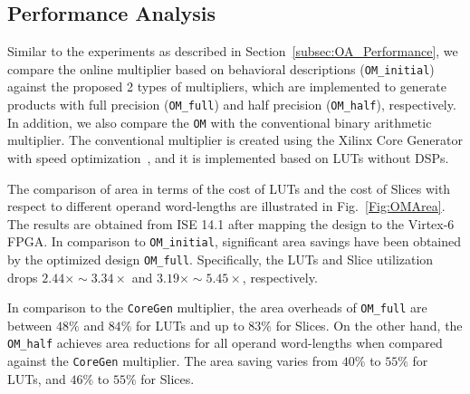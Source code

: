 \documentclass[conference]{IEEEtran}
\begin{document}
\subsection{Performance Analysis}
Similar to the experiments as described in Section~\ref{subsec:OA_Performance}, we compare the online multiplier based on behavioral descriptions (\texttt{OM\_initial}) against the proposed 2 types of multipliers, which are implemented to generate products with full precision (\texttt{OM\_full}) and half precision (\texttt{OM\_half}), respectively. In addition, we also compare the \texttt{OM} with the conventional binary arithmetic multiplier. The conventional multiplier is created using the Xilinx Core Generator with speed optimization~\cite{XilinxMult}, and it is implemented based on LUTs without DSPs.

The comparison of area in terms of the cost of LUTs and the cost of Slices with respect to different operand word-lengths are illustrated in Fig.~\ref{Fig:OMArea}. The results are obtained from ISE 14.1 after mapping the design to the Virtex-6 FPGA. In comparison to \texttt{OM\_initial}, significant area savings have been obtained by the optimized design \texttt{OM\_full}. Specifically, the LUTs and Slice utilization drops $2.44\times\sim3.34\times$ and $3.19\times\sim5.45\times$, respectively.

In comparison to the \texttt{CoreGen} multiplier, the area overheads of \texttt{OM\_full} are between $48\%$ and $84\%$ for LUTs and up to $83\%$ for Slices. On the other hand, the \texttt{OM\_half} achieves area reductions for all operand word-lengths when compared against the \texttt{CoreGen} multiplier. The area saving varies from $40\%$ to $55\%$ for LUTs, and $46\%$ to $55\%$ for Slices.
\end{document}
